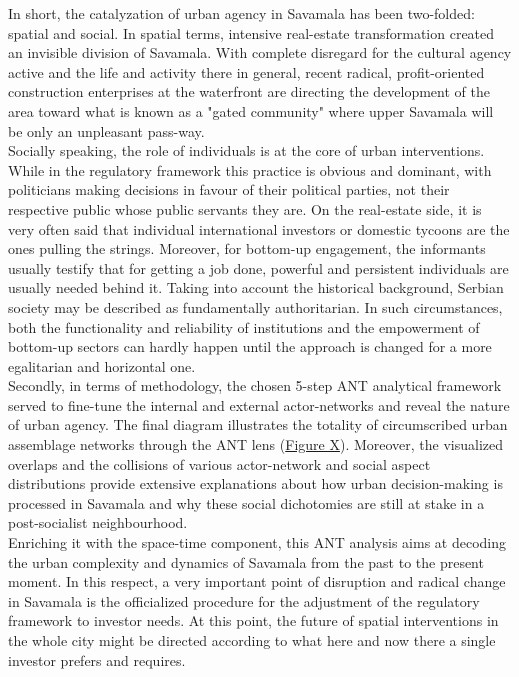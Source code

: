 \documentclass[11pt]{report}
\begin{document}
{{{{In short, the catalyzation of urban agency in Savamala has been two-folded: spatial and social. In spatial terms, intensive real-estate transformation created an invisible division of Savamala. With complete disregard for the cultural agency active and the life and activity there in general, recent radical, profit-oriented construction enterprises at the waterfront are directing the development of the area toward what is known as a "gated community" where upper Savamala will be only an unpleasant pass-way.
\\

Socially speaking, the role of individuals is at the core of urban interventions. While in the regulatory framework this practice is obvious and dominant, with politicians making decisions in favour of their political parties, not their respective public whose public servants they are. On the real-estate side, it is very often said that individual international investors or domestic tycoons are the ones pulling the strings. Moreover, for bottom-up engagement, the informants usually testify that for getting a job done, powerful and persistent individuals are usually needed behind it. Taking into account the historical background, Serbian society may be described as fundamentally authoritarian. In such circumstances, both the functionality and reliability of institutions and the empowerment of bottom-up sectors can hardly happen until the approach is changed for a more egalitarian and horizontal one. 
\\

Secondly, in terms of methodology, the chosen 5-step ANT analytical framework served to fine-tune the internal and external actor-networks and reveal the nature of urban agency. The final diagram illustrates the totality of circumscribed urban assemblage networks through the ANT lens (\href{ANT diagram}{Figure X}).
Moreover, the visualized overlaps and the collisions of various actor-network and social aspect distributions provide extensive explanations about how urban decision-making is processed in Savamala and why these social dichotomies are still at stake in a post-socialist neighbourhood.
\\

Enriching it with the space-time component, this ANT analysis aims at decoding the urban complexity and dynamics of Savamala from the past to the present moment. In this respect, a very important point of disruption and radical change in Savamala is the officialized procedure for the adjustment of the regulatory framework to investor needs. At this point, the future of spatial interventions in the whole city might be directed according to what here and now there a single investor prefers and requires. 
\\

}}}}
\end{document}
